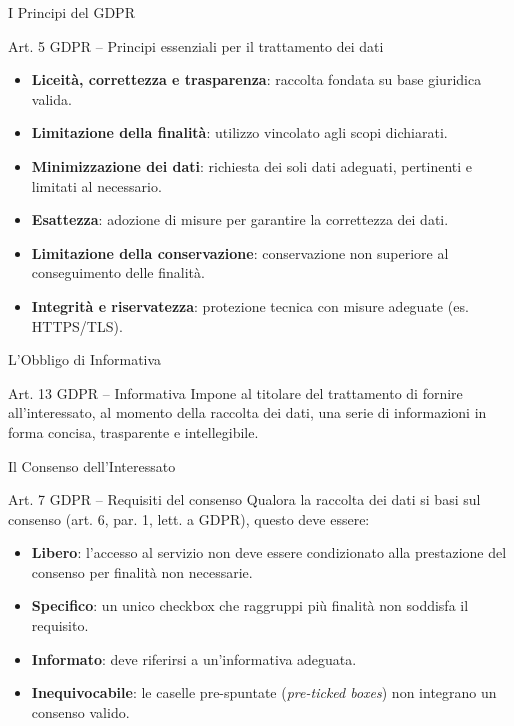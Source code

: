 \documentclass[aspectratio=169]{beamer}
\begin{document}
\begin{frame}{I Principi del GDPR}
  \begin{block}{Art. 5 GDPR -- Principi essenziali per il trattamento dei dati}
    \small
    \begin{itemize}
      \item \textbf{Liceità, correttezza e trasparenza}: raccolta fondata su base giuridica valida.
      \item \textbf{Limitazione della finalità}: utilizzo vincolato agli scopi dichiarati.
      \item \textbf{Minimizzazione dei dati}: richiesta dei soli dati adeguati, pertinenti e limitati al necessario.
      \item \textbf{Esattezza}: adozione di misure per garantire la correttezza dei dati.
      \item \textbf{Limitazione della conservazione}: conservazione non superiore al conseguimento delle finalità.
      \item \textbf{Integrità e riservatezza}: protezione tecnica con misure adeguate (es. HTTPS/TLS).
    \end{itemize}
  \end{block}
\end{frame}

\begin{frame}{L'Obbligo di Informativa}
  \begin{block}{Art. 13 GDPR -- Informativa}
    Impone al titolare del trattamento di fornire all'interessato, al momento della raccolta dei dati, una serie di informazioni in forma concisa, trasparente e intellegibile.
  \end{block}
\end{frame}

\begin{frame}{Il Consenso dell'Interessato}
  \begin{block}{Art. 7 GDPR -- Requisiti del consenso}
    Qualora la raccolta dei dati si basi sul consenso (art. 6, par. 1, lett. a GDPR), questo deve essere:
    \begin{itemize}
      \item \textbf{Libero}: l'accesso al servizio non deve essere condizionato alla prestazione del consenso per finalità non necessarie.
      \item \textbf{Specifico}: un unico checkbox che raggruppi più finalità non soddisfa il requisito.
      \item \textbf{Informato}: deve riferirsi a un'informativa adeguata.
      \item \textbf{Inequivocabile}: le caselle pre-spuntate (\emph{pre-ticked boxes}) non integrano un consenso valido.
    \end{itemize}
  \end{block}
\end{frame}
\end{document}
